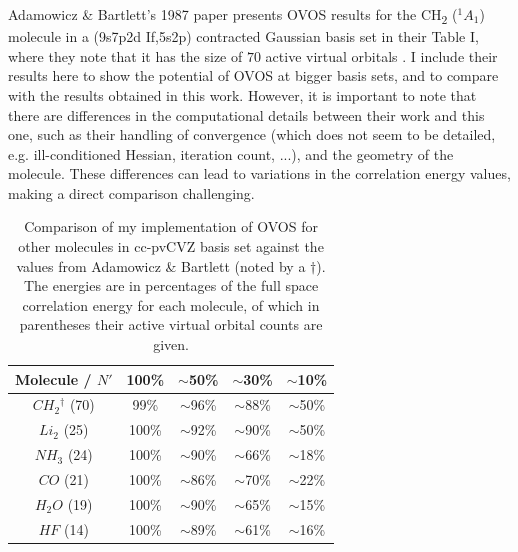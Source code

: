 Adamowicz \& Bartlett's 1987 paper presents OVOS results for the CH\textsubscript{2} ($^1A_1$) molecule in a (9s7p2d If,5s2p) contracted Gaussian basis set in their Table I, where they note that it has the size of $70$ active virtual orbitals \cite{Adamowicz1987}. I include their results here to show the potential of OVOS at bigger basis sets, and to compare with the results obtained in this work. However, it is important to note that there are differences in the computational details between their work and this one, such as their handling of convergence (which does not seem to be detailed, e.g. ill-conditioned Hessian, iteration count, ...), and the geometry of the molecule. These differences can lead to variations in the correlation energy values, making a direct comparison challenging.

\begin{table}[h]
    \centering
    \begin{tabular}{ccccc}
        \hline
        Molecule / $N'$        & 100\%     & $\sim$50\%     & $\sim$30\%     & $\sim$10\% \\
        \hline
        $CH_2$$^\dagger$ (70)  & 99\%      & $\sim$96\%     & $\sim$88\%     & $\sim$50\% \\
        $Li_2$           (25)  & 100\%     & $\sim$92\%     & $\sim$90\%     & $\sim$50\% \\
        $NH_3$           (24)  & 100\%     & $\sim$90\%     & $\sim$66\%     & $\sim$18\% \\
        $CO$             (21)  & 100\%     & $\sim$86\%     & $\sim$70\%     & $\sim$22\% \\
        $H_2O$           (19)  & 100\%     & $\sim$90\%     & $\sim$65\%     & $\sim$15\% \\
        $HF$             (14)  & 100\%     & $\sim$89\%     & $\sim$61\%     & $\sim$16\% \\
        \hline
    \end{tabular}
    \caption{Comparison of my implementation of OVOS for other molecules in cc-pvCVZ basis set against the values from Adamowicz \& Bartlett \cite{Adamowicz1987} (noted by a $\dagger$). The energies are in percentages of the full space correlation energy for each molecule, of which in parentheses their active virtual orbital counts are given.}
    \label{tab:comparison_AB}
\end{table}

